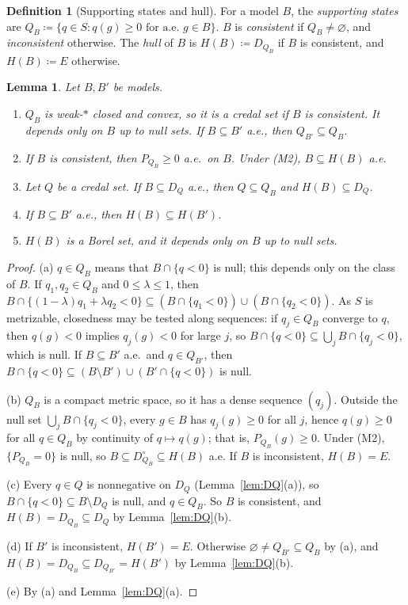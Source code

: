 \documentclass[11pt]{article}
\newtheorem{lemma}[theorem]{Lemma}
\theoremstyle{definition}
\newtheorem{definition}[theorem]{Definition}
\begin{document}
\begin{definition}[Supporting states and hull]\label{def:hull}
For a model $B$, the \emph{supporting states} are $Q_B\coloneqq\{q\in S:q(g)\ge0\text{ for a.e.\ }g\in B\}$. $B$ is \emph{consistent} if $Q_B\ne\varnothing$, and \emph{inconsistent} otherwise. The \emph{hull} of $B$ is $H(B)\coloneqq D_{Q_B}$ if $B$ is consistent, and $H(B)\coloneqq E$ otherwise.
\end{definition}

\begin{lemma}\label{lem:hull}
Let $B,B'$ be models.
\begin{enumerate}[label=(\alph*)]
\item $Q_B$ is weak-$\ast$ closed and convex, so it is a credal set if $B$ is consistent. It depends only on $B$ up to null sets. If $B\subseteq B'$ a.e., then $Q_{B'}\subseteq Q_B$.
\item If $B$ is consistent, then $P_{Q_B}\ge0$ a.e.\ on $B$. Under (M2), $B\subseteq H(B)$ a.e.
\item Let $Q$ be a credal set. If $B\subseteq D_Q$ a.e., then $Q\subseteq Q_B$ and $H(B)\subseteq D_Q$.
\item If $B\subseteq B'$ a.e., then $H(B)\subseteq H(B')$.
\item $H(B)$ is a Borel set, and it depends only on $B$ up to null sets.
\end{enumerate}
\end{lemma}
\begin{proof}
(a) $q\in Q_B$ means that $B\cap\{q<0\}$ is null; this depends only on the class of $B$. If $q_1,q_2\in Q_B$ and $0\le\lambda\le1$, then $B\cap\{(1-\lambda)q_1+\lambda q_2<0\}\subseteq(B\cap\{q_1<0\})\cup(B\cap\{q_2<0\})$. As $S$ is metrizable, closedness may be tested along sequences: if $q_j\in Q_B$ converge to $q$, then $q(g)<0$ implies $q_j(g)<0$ for large $j$, so $B\cap\{q<0\}\subseteq\bigcup_jB\cap\{q_j<0\}$, which is null. If $B\subseteq B'$ a.e.\ and $q\in Q_{B'}$, then $B\cap\{q<0\}\subseteq(B\setminus B')\cup(B'\cap\{q<0\})$ is null.

(b) $Q_B$ is a compact metric space, so it has a dense sequence $(q_j)$. Outside the null set $\bigcup_jB\cap\{q_j<0\}$, every $g\in B$ has $q_j(g)\ge0$ for all $j$, hence $q(g)\ge0$ for all $q\in Q_B$ by continuity of $q\mapsto q(g)$; that is, $P_{Q_B}(g)\ge0$. Under (M2), $\{P_{Q_B}=0\}$ is null, so $B\subseteq D^\circ_{Q_B}\subseteq H(B)$ a.e. If $B$ is inconsistent, $H(B)=E$.

(c) Every $q\in Q$ is nonnegative on $D_Q$ (Lemma~\ref{lem:DQ}(a)), so $B\cap\{q<0\}\subseteq B\setminus D_Q$ is null, and $q\in Q_B$. So $B$ is consistent, and $H(B)=D_{Q_B}\subseteq D_Q$ by Lemma~\ref{lem:DQ}(b).

(d) If $B'$ is inconsistent, $H(B')=E$. Otherwise $\varnothing\ne Q_{B'}\subseteq Q_B$ by (a), and $H(B)=D_{Q_B}\subseteq D_{Q_{B'}}=H(B')$ by Lemma~\ref{lem:DQ}(b).

(e) By (a) and Lemma~\ref{lem:DQ}(a).
\end{proof}
\end{document}
